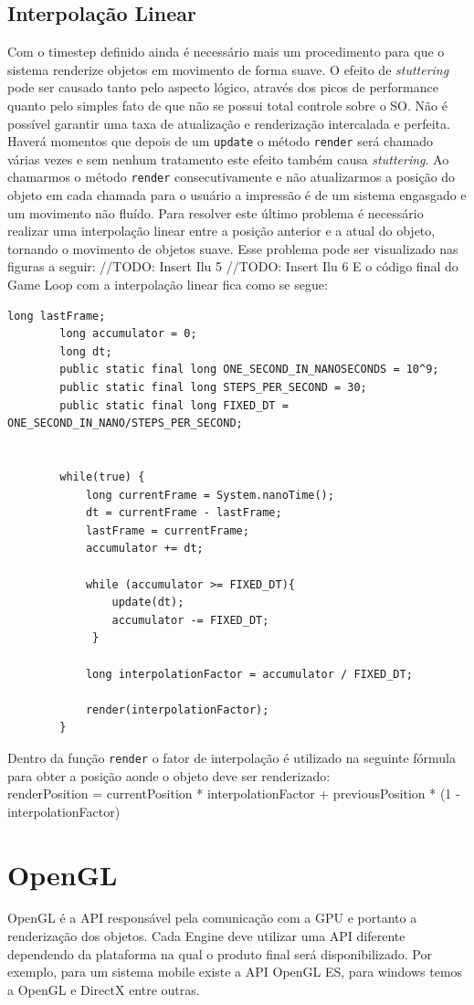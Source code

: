 \documentclass[12pt, 
openright, 
oneside, 
a4paper,    
brazil]{facom-ufu-abntex2}
\begin{document}
\subsection{Interpolação Linear} 
Com o timestep definido ainda é necessário mais um procedimento para que o sistema renderize objetos em movimento de forma suave. O efeito de \textit{stuttering} pode ser causado tanto pelo aspecto lógico, através dos picos de performance quanto pelo simples fato de que não se possui total controle sobre o SO. Não é possível garantir uma taxa de atualização e renderização intercalada e perfeita. Haverá momentos que depois de um \texttt{update} o método \texttt{render} será chamado várias vezes e sem nenhum tratamento este efeito também causa \textit{stuttering}. Ao chamarmos o método \texttt{render} consecutivamente e não atualizarmos a posição do objeto em cada chamada para o usuário a impressão é de um sistema engasgado e um movimento não fluído.
Para resolver este último problema é necessário realizar uma interpolação linear entre a posição anterior e a atual do objeto, tornando o movimento de objetos suave. Esse problema pode ser visualizado nas figuras a seguir:
//TODO: Insert Ilu 5
//TODO: Insert Ilu 6
E o código final do Game Loop com a interpolação linear fica como se segue:
\begin{lstlisting}[caption=Game Loop com timestep semi-fixo e interpolação linear]
		long lastFrame;
		long accumulator = 0;
		long dt;
		public static final long ONE_SECOND_IN_NANOSECONDS = 10^9;
		public static final long STEPS_PER_SECOND = 30;
		public static final long FIXED_DT = ONE_SECOND_IN_NANO/STEPS_PER_SECOND;
		
		
		while(true) {
			long currentFrame = System.nanoTime(); 
			dt = currentFrame - lastFrame;
			lastFrame = currentFrame;
			accumulator += dt;
	
			while (accumulator >= FIXED_DT){
    			update(dt);
    			accumulator -= FIXED_DT;
 			 }
 			 
			long interpolationFactor = accumulator / FIXED_DT; 			 
 			 
			render(interpolationFactor);
		}
\end{lstlisting}
Dentro da função \texttt{render} o fator de interpolação é utilizado na seguinte fórmula para obter a posição aonde o objeto deve ser renderizado:\\
renderPosition = currentPosition * interpolationFactor + previousPosition * (1 - interpolationFactor)
\section{OpenGL}
OpenGL é a API responsável pela comunicação com a GPU e portanto a renderização dos objetos. Cada Engine deve utilizar uma API diferente dependendo da plataforma na qual o produto final será disponibilizado. Por exemplo, para um sistema mobile existe a API OpenGL ES, para windows temos a OpenGL e DirectX entre outras.
\end{document}
